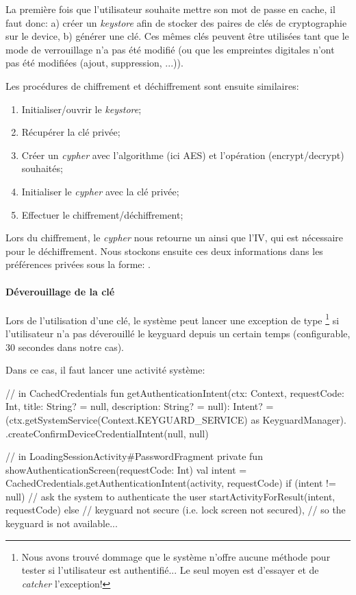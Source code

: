La première fois que l'utilisateur souhaite mettre son mot de passe en cache, il faut donc: a)  créer un \emph{keystore} afin de stocker des paires de clés de cryptographie sur le device, b) générer une clé. Ces mêmes clés peuvent  être utilisées tant que le mode de verrouillage n'a pas été modifié (ou que les empreintes digitales n'ont pas été modifiées (ajout, suppression, ...)).

Les procédures de chiffrement et déchiffrement sont ensuite similaires:

\begin{enumerate}
    \item Initialiser/ouvrir le \emph{keystore};
    \item Récupérer la clé privée;
    \item Créer un \emph{cypher} avec l'algorithme (ici AES) et l'opération (encrypt/decrypt) souhaités;
    \item Initialiser le \emph{cypher} avec la clé privée;
    \item Effectuer le chiffrement/déchiffrement;
\end{enumerate}

Lors du chiffrement, le \emph{cypher} nous retourne un  ainsi que l'IV, qui est nécessaire pour le déchiffrement. Nous stockons ensuite ces deux informations dans les préférences privées sous la forme: .

\paragraph*{Déverouillage de la clé} Lors de l'utilisation d'une clé, le système peut lancer une exception de type \footnote{Nous avons trouvé dommage que le système n'offre aucune méthode pour tester si l'utilisateur est authentifié... Le seul moyen est d'essayer et de \emph{catcher} l'exception!} si l'utilisateur n'a pas déverouillé le keyguard depuis un certain temps (configurable, 30 secondes dans notre cas). 

Dans ce cas, il faut lancer une activité système:

\begin{kotlincode}
// in CachedCredentials
fun getAuthenticationIntent(ctx: Context, requestCode: Int, 
    title: String? = null, description: String? = null): Intent? =
    (ctx.getSystemService(Context.KEYGUARD_SERVICE) as KeyguardManager).
        .createConfirmDeviceCredentialIntent(null, null)


// in LoadingSessionActivity#PasswordFragment
private fun showAuthenticationScreen(requestCode: Int) {
    val intent = CachedCredentials.getAuthenticationIntent(activity, requestCode)
    if (intent != null) {
        // ask the system to authenticate the user
        startActivityForResult(intent, requestCode)
    } else {
        // keyguard not secure (i.e. lock screen not secured),
        // so the keyguard is not available...
    }
}
\end{kotlincode}

